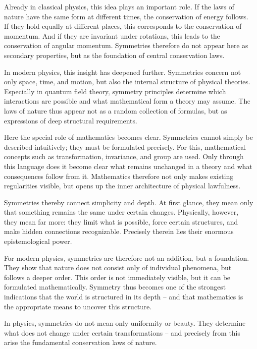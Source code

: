 Already in classical physics,
this idea plays an important role.
If the laws of nature have the same form at different times,
the conservation of energy follows.
If they hold equally at different places,
this corresponds to the conservation of momentum.
And if they are invariant under rotations,
this leads to the conservation of angular momentum.
Symmetries therefore do not appear here as secondary properties,
but as the foundation of central conservation laws.

In modern physics, this insight has deepened further.
Symmetries concern not only space,
time,
and motion,
but also the internal structure of physical theories.
Especially in quantum field theory,
symmetry principles determine
which interactions are possible
and what mathematical form a theory may assume.
The laws of nature thus appear not as a random collection of formulas,
but as expressions of deep structural requirements.

Here the special role of mathematics becomes clear.
Symmetries cannot simply be described intuitively;
they must be formulated precisely.
For this, mathematical concepts such as transformation,
invariance,
and group are used.
Only through this language does it become clear
what remains unchanged in a theory
and what consequences follow from it.
Mathematics therefore not only makes existing regularities visible,
but opens up the inner architecture of physical lawfulness.

Symmetries thereby connect simplicity and depth.
At first glance, they mean only
that something remains the same under certain changes.
Physically, however, they mean far more:
they limit what is possible,
force certain structures,
and make hidden connections recognizable.
Precisely therein lies their enormous epistemological power.

For modern physics, symmetries are therefore not an addition,
but a foundation.
They show
that nature does not consist only of individual phenomena,
but follows a deeper order.
This order is not immediately visible,
but it can be formulated mathematically.
Symmetry thus becomes one of the strongest indications
that the world is structured in its depth --
and that mathematics is the appropriate means
to uncover this structure.

\begin{DidacticBox}
	
	\label{box:symmetry-conservation}
	In physics, symmetries do not mean only uniformity or beauty.
	They determine what does not change under certain transformations --
	and precisely from this arise the fundamental conservation laws of nature.
\end{DidacticBox}

